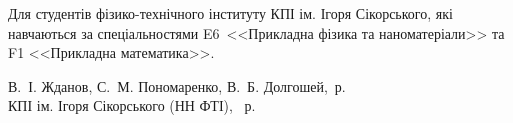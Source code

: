 {\begin{alwayssingle}
		Для студентів фізико-технічного інституту КПІ ім. Ігоря Сікорського, які навчаються за спеціальностями E6~<<Прикладна фізика та наноматеріали>> та F1 <<Прикладна математика>>.

		\vfill

	\hfill
        \begin{flushright}
    	\begin{minipage}[t]{0.8\linewidth}\small
        \textcopyright{} В.~І. Жданов, С.~М. Пономаренко, В.~Б. Долгошей, \the\year\,р. \\
        \textcopyright{}  КПІ ім. Ігоря Сікорського (НН ФТІ), \the\year~р.
        \end{minipage}
        \end{flushright}
		\newpage%
	\end{alwayssingle}
}

